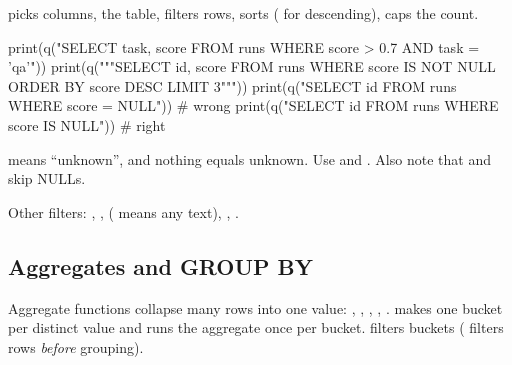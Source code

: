  picks columns,  the table,  filters rows,
 sorts ( for descending),  caps the count.

\begin{pycode}
print(q("SELECT task, score FROM runs WHERE score > 0.7 AND task = 'qa'"))
print(q("""SELECT id, score FROM runs WHERE score IS NOT NULL
           ORDER BY score DESC LIMIT 3"""))
print(q("SELECT id FROM runs WHERE score = NULL"))    # wrong
print(q("SELECT id FROM runs WHERE score IS NULL"))   # right
\end{pycode}
\begin{rawcode}
[('qa', 0.71), ('qa', 0.9), ('qa', 0.88)]
[(3, 0.9), (5, 0.88), (4, 0.84)]
[]
[(6,)]
\end{rawcode}

\begin{trap}[: \code{= NULL} never matches]
 means ``unknown'', and nothing equals unknown. Use  and
. Also note that  and  skip NULLs.
\end{trap}

Other filters: , ,  (\code{\%}
means any text), , .

\subsection{Aggregates and GROUP BY}

Aggregate functions collapse many rows into one value: , ,
, , .  makes one bucket per distinct value and
runs the aggregate once per bucket.  filters buckets ( filters rows
\emph{before} grouping).

